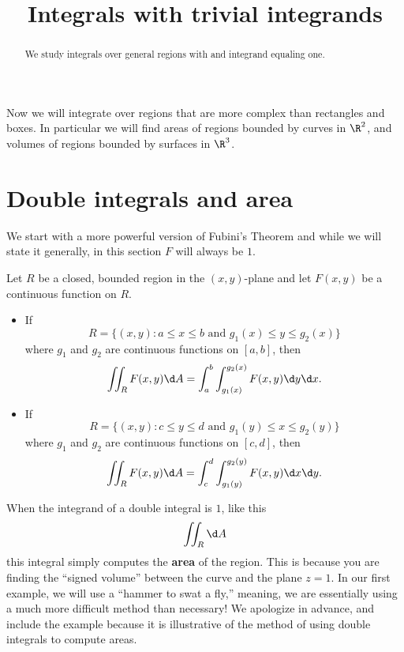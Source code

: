 \documentclass{ximera}
\title[Dig-In:]{Integrals with trivial integrands}
\begin{document}
\begin{abstract}
  We study integrals over general regions with and integrand equaling one.
\end{abstract}
\maketitle


Now we will integrate over regions that are more complex than
rectangles and boxes. In particular we will find areas of regions
bounded by curves in $\R^2$, and volumes of regions bounded by
surfaces in $\R^3$.

\section{Double integrals and area}

We start with a more powerful version of Fubini's
Theorem and while we will state it generally, in this section $F$ will
always be $1$.

\begin{theorem}
  Let $R$ be a closed, bounded region in the $(x,y)$-plane and let
  $F(x,y)$ be a continuous function on $R$.
  \begin{itemize}
  \item If
    \[
    R=\{(x,y):\text{$a\leq x\leq b$ and $g_1(x)\leq y\leq g_2(x)$}\}
    \]
    where $g_1$ and $g_2$ are continuous functions on $[a,b]$, then
    \[
    \iint_R F(x,y) \d A = \int_a^b\int_{g_1(x)}^{g_2(x)} F(x,y)\d y\d x.
    \]
  \item If
    \[
    R=\{(x,y):\text{$c\leq y\leq d$ and $g_1(y)\leq x\leq g_2(y)$}\}
    \]
    where $g_1$ and $g_2$ are continuous functions on $[c,d]$, then
    \[
    \iint_R F(x,y)\d A = \int_c^d\int_{g_1(y)}^{g_2(y)} F(x,y)\d x\d y.
    \]
\end{itemize}
\end{theorem}

When the integrand of a double integral is $1$, like this
\[
\iint_R\d A
\]
this integral simply computes the \textbf{area} of the region. This is
because you are finding the ``signed volume'' between the curve and
the plane $z=1$. In our first example, we will use a ``hammer to swat
a fly,'' meaning, we are essentially using a much more difficult
method than necessary! We apologize in advance, and include the
example because it is illustrative of the method of using double
integrals to compute areas.
\end{document}
